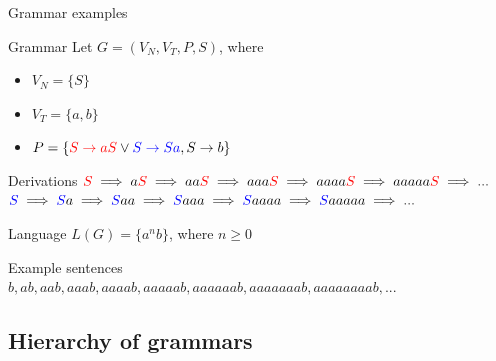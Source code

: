 \documentclass{beamer}
\begin{document}
\begin{frame}{Grammar examples}
	\begin{block}{Grammar}
		Let $G = (V_N, V_T, P, S)$, where 
		\begin{itemize}
			\item $V_N = \{S\}$
			\item $V_T = \{a,b\}$
			\item $P = \{\textcolor{red}{S \rightarrow aS} \lor \textcolor{blue}{S \rightarrow Sa}, S \rightarrow b\}$
		\end{itemize}
	\end{block}
	
	\begin{block}{Derivations}
		$\textcolor{red}{S}\implies a\textcolor{red}{S}\implies aa\textcolor{red}{S} \implies aaa\textcolor{red}{S} \implies aaaa\textcolor{red}{S} \implies aaaaa\textcolor{red}{S} \implies ...$
		\\ $\textcolor{blue}{S}\implies \textcolor{blue}{S}a\implies \textcolor{blue}{S}aa \implies \textcolor{blue}{S}aaa \implies \textcolor{blue}{S}aaaa \implies \textcolor{blue}{S}aaaaa \implies ...$
	\end{block}
	
	\begin{block}{Language}
		$L(G) = \{a^{n}b\}$, where $n \geq 0$
	\end{block}
	
	\begin{exampleblock}{Example sentences}
		$b, ab, aab, aaab, aaaab, aaaaab, aaaaaab, aaaaaaab, aaaaaaaab, ...$
	\end{exampleblock}
\end{frame}
 

\subsection{Hierarchy of grammars}
\end{document}
